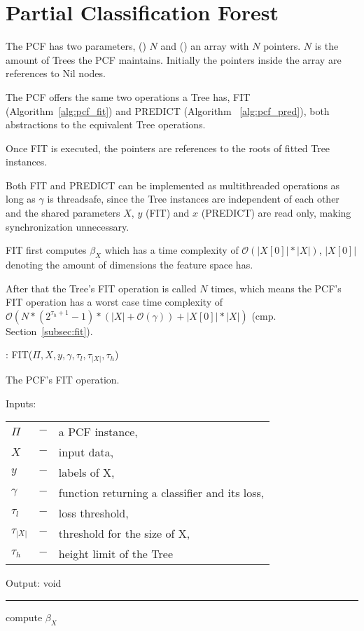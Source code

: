 \section{Partial Classification Forest}
\label{sec:pcf}

The PCF has two parameters, () $N$ and
() an array with $N$ pointers.
$N$ is the amount of Trees the PCF maintains.
Initially the pointers inside the array are references to
Nil nodes.

The PCF offers the same two operations a Tree has, FIT
(Algorithm~\ref{alg:pcf_fit}) and PREDICT (Algorithm~%
\ref{alg:pcf_pred}), both abstractions to the equivalent
Tree operations.

Once FIT is executed, the pointers are references to the
roots of fitted Tree instances.

Both FIT and PREDICT can be implemented as multithreaded
operations as long as $\gamma$ is threadsafe, since the
Tree instances are independent of each other and the shared
parameters $X$, $y$ (FIT) and $x$ (PREDICT) are read only,
making synchronization unnecessary.

FIT first computes $\beta_X$ which has a time complexity of
$\mathcal{O}(|X[0]| * |X|)$, $|X[0]|$ denoting the amount
of dimensions the feature space has.

After that the Tree's FIT operation is called $N$ times,
which means the PCF's FIT operation has a worst case time
complexity of $\mathcal{O} (N * (2^{\tau_h + 1} - 1) *
(|X| + \mathcal{O}(\gamma)) + |X[0]| * |X|)$
(cmp. Section~\ref{subsec:fit}).

\begin{algorithm}
  \caption{: FIT($\Pi, X, y, \gamma, \tau_{l},
    \tau_{|X|}, \tau_{h}$)}%
  \label{alg:pcf_fit}
  The PCF's FIT operation.

  Inputs:

    \begin{tabu}{llX}
    $\Pi$ &$-$ &a PCF instance,\\
    $X$ &$-$ &input data,\\
    $y$ &$-$ &labels of X,\\
    $\gamma$ &$-$ &function returning a classifier and its
      loss,\\
    $\tau_{l}$ &$-$ &loss threshold,\\
    $\tau_{|X|}$ &$-$ &threshold for the size of X,\\
    $\tau_{h}$ &$-$ &height limit of the Tree
    \end{tabu}

  Output: void

  \noindent\rule{\linewidth}{0.4pt}

  \begin{algorithmic}[1]
    \STATE compute $\beta_X$
    \ENDFOR
  \end{algorithmic}
\end{algorithm}

